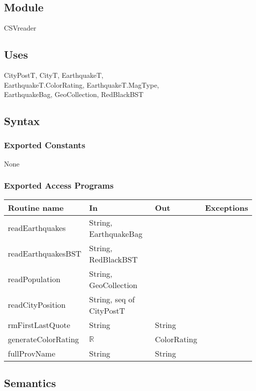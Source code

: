 \documentclass[12pt]{article}
\begin{document}
\subsection* {Module}

CSVreader

\subsection* {Uses}

CityPostT, CityT, EarthquakeT,\\
EarthquakeT.ColorRating, EarthquakeT.MagType,\\
EarthquakeBag, GeoCollection, RedBlackBST

\subsection* {Syntax}

\subsubsection* {Exported Constants}

None

\subsubsection* {Exported Access Programs}

\begin{tabular}{| l | l | l | l |}
\hline
\textbf{Routine name} & \textbf{In} & \textbf{Out} & \textbf{Exceptions}\\
\hline
readEarthquakes & String, EarthquakeBag & ~ & ~\\
\hline
readEarthquakesBST & String, RedBlackBST & ~ & ~\\
\hline
readPopulation & String, GeoCollection & ~ & ~\\
\hline
readCityPosition & String, seq of CityPostT & ~ & ~\\
\hline
rmFirstLastQuote & String & String & ~\\
\hline
generateColorRating & $\mathbb{R}$ & ColorRating & ~\\
\hline
fullProvName & String & String & ~\\
\hline
\end{tabular}

\subsection* {Semantics}
\end{document}
